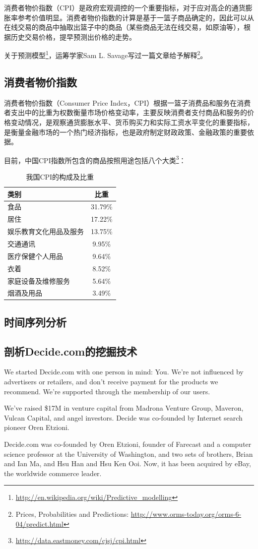 消费者物价指数（CPI）是政府宏观调控的一个重要指标，对于应对高企的通货膨胀率参考价值明显。消费者物价指数的计算是基于一篮子商品确定的，因此可以从在线交易的商品中抽取出篮子中的商品（某些商品无法在线交易，如原油等），根据历史交易价格，提早预测出价格的走势。

关于预测模型\footnote{\url{http://en.wikipedia.org/wiki/Predictive\_modelling}}，运筹学家Sam L. Savage写过一篇文章给予解释\footnote{Prices, Probabilities and Predictions: \url{http://www.orms-today.org/orms-6-04/predict.html}}。

\subsection{消费者物价指数}
消费者物价指数（Consumer Price Index，CPI）根据一篮子消费品和服务在消费者支出中的比重为权数衡量市场价格变动率，主要反映消费者支付商品和服务的价格变动情况，是观察通货膨胀水平、货币购买力和实际工资水平变化的重要指标，是衡量金融市场的一个热门经济指标，也是政府制定财政政策、金融政策的重要依据。

目前，中国CPI指数所包含的商品按照用途包括八个大类\footnote{\url{http://data.eastmoney.com/cjsj/cpi.html}}：
\begin{table}[htbp]
\centering
\caption{我国CPI的构成及比重}
\begin{tabular}{|l|c|}
  \hline
  类别 & 比重\\
  \hline
  食品 & 31.79\%\\
  \hline
  居住 & 17.22\%\\
  \hline
  娱乐教育文化用品及服务 & 13.75\%\\
  \hline
  交通通讯 & 9.95\%\\
  \hline
  医疗保健个人用品 & 9.64\%\\
  \hline
  衣着 & 8.52\%\\
  \hline
  家庭设备及维修服务 & 5.64\%\\
  \hline
  烟酒及用品 & 3.49\%\\
  \hline
\end{tabular}
\end{table}

\subsection{时间序列分析}

\subsection{剖析Decide.com的挖掘技术}
We started Decide.com with one person in mind: You. We're not influenced by advertisers or retailers, and don't receive payment for the products we recommend. We're supported through the membership of our users.

We've raised \$17M in venture capital from Madrona Venture Group, Maveron, Vulcan Capital, and angel investors. Decide was co-founded by Internet search pioneer Oren Etzioni.

Decide.com was co-founded by Oren Etzioni, founder of Farecast and a computer science professor at the University of Washington, and two sets of brothers, Brian and Ian Ma, and Hsu Han and Hsu Ken Ooi. Now, it has been acquired by eBay, the worldwide commerce leader.
